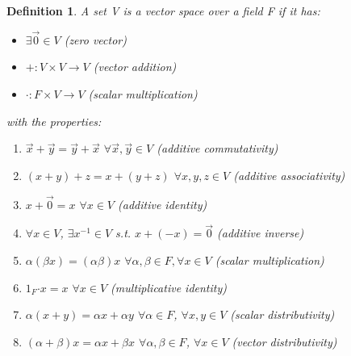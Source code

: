 \documentclass[10pt, oneside]{article}
\newcommand{\Cdot}{\boldsymbol{\cdot}}
\newtheorem{defn}{Definition}
\begin{document}
\begin{defn} A set V is a {\em vector space} over a field F if it has:
    \begin{itemize}
        \item $\exists \vec{0} \in V$ (zero vector)
        \item $+: V \times V \to V$ (vector addition)
        \item $\Cdot: F \times V \to V$ (scalar multiplication)
    \end{itemize}
    with the properties:
    \begin{enumerate}
        \item $\vec{x} + \vec{y} = \vec{y} + \vec{x}$ $\forall \vec{x}, \vec{y} \in V$ (additive commutativity)
        \item $(x + y) + z = x + (y + z)$ $\forall x, y, z \in V$ (additive associativity)
        \item $x + \vec{0} = x$ $\forall x \in V$ (additive identity)
        \item $\forall x \in V$, $\exists x^{-1} \in V$ s.t. $x + (-x) = \vec{0}$ (additive inverse)
        \item $\alpha(\beta x) = (\alpha \beta)x$ $\forall \alpha, \beta \in F, \forall x \in V$ (scalar multiplication)
        \item $1_F \Cdot x = x$ $\forall x \in V$ (multiplicative identity)
        \item $\alpha(x + y) = \alpha x + \alpha y$ $\forall \alpha \in F$, $\forall x, y \in V$ (scalar distributivity)
        \item $(\alpha + \beta)x = \alpha x + \beta x$ $\forall \alpha, \beta \in F$, $\forall x \in V$ (vector distributivity)
    \end{enumerate}
\end{defn}
\end{document}
